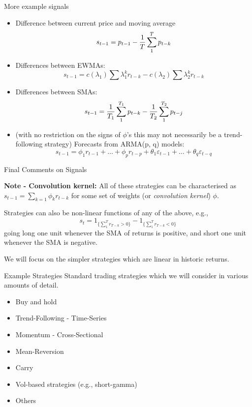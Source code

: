 \begin{frame}{More example signals}
    \begin{itemize}
    \item 
    Difference between current price and moving average
    $$s_{t-1}= p_{t-1} - {1\over T}\sum_1^T p_{t-k}$$
    \item 
    Differences between EWMAs: $$s_{t-1}=c(\lambda_1)\sum \lambda_1^k r_{t-k}-c(\lambda_2)\sum \lambda_2^k r_{t-k}$$
    \item 
    Differences between SMAs: $$s_{t-1}= {1\over {T_1}}\sum_1^{T_1} p_{t-k} - {1\over {T_2}}\sum_1^{T_2} p_{t-j}$$
    \item 
    (with no restriction on the signs of $\phi$'s this may not necessarily be a trend-following strategy) Forecasts from ARMA(p, q) models: $$s_{t-1} = \phi_1 r_{t-1} + \ldots+ \phi_p r_{t-p} + \theta_1 
    \varepsilon_{t-1} + \ldots + \theta_q \varepsilon_{t-q} $$
    \end{itemize}
\end{frame}


\begin{frame}{Final Comments on Signals}

{\bf Note - Convolution kernel:}  All of these strategies can be characterised as $s_{t-1} = \sum_{k=1} \phi_k r_{t-k}$ for some set of weights (or {\em convolution kernel}) $\phi$.

Strategies can also be non-linear functions of any of the above, e.g.,
$$s_t = 1_{\{\sum_1^T r_{T-k}>0\}}-1_{\{\sum_1^T r_{T-k}<0\}}$$
going long one unit whenever the SMA of returns is positive, and short one unit whenever the SMA is negative.

We will focus on the simpler strategies which are linear in historic returns.
\end{frame}


\begin{frame}{Example Strategies}
Standard trading strategies which we will consider in various amounts of detail.
    \begin{itemize}
    \item 
    Buy and hold
    \item 
    Trend-Following - Time-Series
    \item 
    Momentum - Cross-Sectional
    \item 
    Mean-Reversion
    \item 
    Carry
    \item 
    Vol-based strategies (e.g., short-gamma)
    \item 
    Others
    \end{itemize}
\end{frame}


